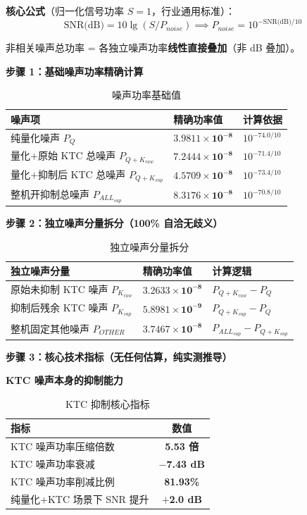\documentclass[11pt,a4paper,UTF8]{ctexart}
\begin{document}
\textbf{核心公式}（归一化信号功率 $S=1$，行业通用标准）：
$$\text{SNR(dB)} = 10\lg(S/P_{noise}) \implies P_{noise} = 10^{-\text{SNR(dB)}/10}$$

非相关噪声总功率 = 各独立噪声功率\textbf{线性直接叠加}（非 dB 叠加）。

\textbf{步骤 1：基础噪声功率精确计算}

\begin{table}[htbp]\centering\caption{噪声功率基础值}\label{tab:pnoise}\small
\begin{tabular}{lll}\toprule
\textbf{噪声项} & \textbf{精确功率值} & \textbf{计算依据} \\\midrule
纯量化噪声 $P_Q$ & $\boldsymbol{3.9811\times 10^{-8}}$ & $10^{-74.0/10}$ \\
量化$+$原始 KTC 总噪声 $P_{Q+K_{raw}}$ & $\boldsymbol{7.2444\times 10^{-8}}$ & $10^{-71.4/10}$ \\
量化$+$抑制后 KTC 总噪声 $P_{Q+K_{sup}}$ & $\boldsymbol{4.5709\times 10^{-8}}$ & $10^{-73.4/10}$ \\
整机开抑制总噪声 $P_{ALL_{sup}}$ & $\boldsymbol{8.3176\times 10^{-8}}$ & $10^{-70.8/10}$ \\\bottomrule
\end{tabular}
\end{table}

\textbf{步骤 2：独立噪声分量拆分（100\% 自洽无歧义）}

\begin{table}[htbp]\centering\caption{独立噪声分量拆分}\label{tab:split}\small
\begin{tabular}{lll}\toprule
\textbf{独立噪声分量} & \textbf{精确功率值} & \textbf{计算逻辑} \\\midrule
原始未抑制 KTC 噪声 $P_{K_{raw}}$ & $\boldsymbol{3.2633\times 10^{-8}}$ & $P_{Q+K_{raw}} - P_Q$ \\
抑制后残余 KTC 噪声 $P_{K_{sup}}$ & $\boldsymbol{5.8981\times 10^{-9}}$ & $P_{Q+K_{sup}} - P_Q$ \\
整机固定其他噪声 $P_{OTHER}$ & $\boldsymbol{3.7467\times 10^{-8}}$ & $P_{ALL_{sup}} - P_{Q+K_{sup}}$ \\\bottomrule
\end{tabular}
\end{table}

\textbf{步骤 3：核心技术指标（无任何估算，纯实测推导）}

\textbf{KTC 噪声本身的抑制能力}

\begin{table}[htbp]\centering\caption{KTC 抑制核心指标}\label{tab:ktc-core}\small
\begin{tabular}{lc}\toprule
\textbf{指标} & \textbf{数值} \\\midrule
KTC 噪声功率压缩倍数 & \textbf{5.53 倍} \\
KTC 噪声功率衰减 & \textbf{$-$7.43 dB} \\
KTC 噪声功率削减比例 & \textbf{81.93\%} \\
纯量化$+$KTC 场景下 SNR 提升 & \textbf{$+$2.0 dB} \\\bottomrule
\end{tabular}
\end{table}
\end{document}
